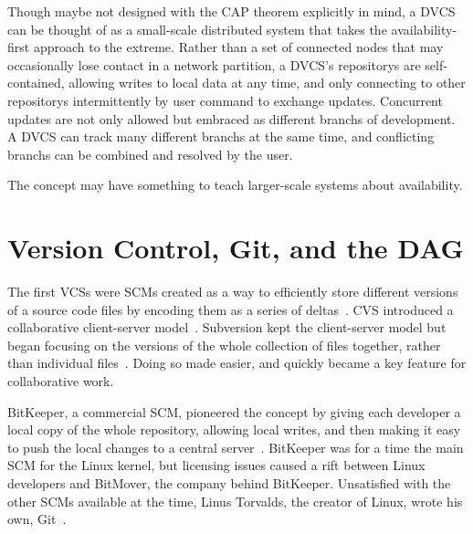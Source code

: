 Though maybe not designed with the CAP theorem explicitly in mind, a \gls{DVCS}
can be thought of as a small-scale distributed system that takes the
availability-first approach to the extreme. Rather than a set of connected nodes
that may occasionally lose contact in a network partition, a \gls{DVCS}'s
\glspl{repository} are self-contained, allowing writes to local data at any
time, and only connecting to other \glspl{repository} intermittently by user
command to exchange updates. Concurrent updates are not only allowed but
embraced as different \glspl{branch} of development. A \gls{DVCS} can track many
different \glspl{branch} at the same time, and conflicting \glspl{branch} can be
combined and resolved by the user.

The  concept may have something to
teach larger-scale systems about availability.

%



\section{Version Control, Git, and the DAG}

The first \glspl{VCS} were \glspl{SCM} created as a way to efficiently store
different versions of a source code files by encoding them as a series of
deltas~\cite{history_of_version_control}. CVS introduced a collaborative
client-server model~\cite{history_of_version_control,cvs_book}. Subversion kept
the client-server model but began focusing on the versions of the whole
collection of files together, rather than individual
files~\cite{history_of_version_control,svnbook}. Doing so made
 easier, and  quickly
became a key feature for collaborative work.

BitKeeper, a commercial \gls{SCM}, pioneered the  concept by giving each developer a local copy of the whole
\gls{repository}, allowing local writes, and then making it easy to push the
local changes to a central
server~\cite{history_of_version_control,git_10_years_interview}. BitKeeper was
for a time the main \acrlong{SCM} for the Linux kernel, but licensing issues
caused a rift between Linux developers and BitMover, the company behind
BitKeeper. Unsatisfied with the other \glspl{SCM} available at the time, Linus
Torvalds, the creator of Linux, wrote his own,
Git~\cite{history_of_version_control,git_10_years_interview}.

